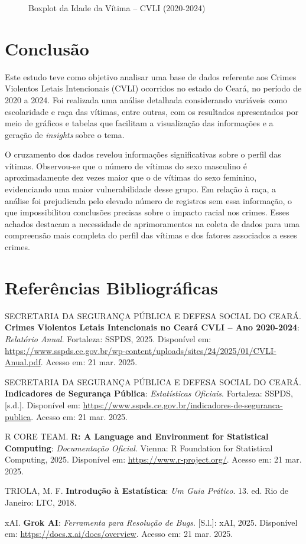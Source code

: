 \documentclass{exam}
\begin{document}
\begin{questions}
\begin{figure}[H]
    \centering
    
    \caption{Boxplot da Idade da Vítima -- CVLI (2020-2024)}
    \label{fig:boxplot_idade}
\end{figure}

\end{questions}

\section{Conclusão}
Este estudo teve como objetivo analisar uma base de dados referente aos Crimes Violentos Letais Intencionais (CVLI) ocorridos no estado do Ceará, no período de 2020 a 2024. Foi realizada uma análise detalhada considerando variáveis como escolaridade e raça das vítimas, entre outras, com os resultados apresentados por meio de gráficos e tabelas que facilitam a visualização das informações e a geração de \textit{insights} sobre o tema.

O cruzamento dos dados revelou informações significativas sobre o perfil das vítimas. Observou-se que o número de vítimas do sexo masculino é aproximadamente dez vezes maior que o de vítimas do sexo feminino, evidenciando uma maior vulnerabilidade desse grupo. Em relação à raça, a análise foi prejudicada pelo elevado número de registros sem essa informação, o que impossibilitou conclusões precisas sobre o impacto racial nos crimes. Esses achados destacam a necessidade de aprimoramentos na coleta de dados para uma compreensão mais completa do perfil das vítimas e dos fatores associados a esses crimes.

\section{Referências Bibliográficas}
SECRETARIA DA SEGURANÇA PÚBLICA E DEFESA SOCIAL DO CEARÁ. \textbf{Crimes Violentos Letais Intencionais no Ceará CVLI – Ano 2020-2024}: \textit{Relatório Anual}. Fortaleza: SSPDS, 2025. Disponível em: \url{https://www.sspds.ce.gov.br/wp-content/uploads/sites/24/2025/01/CVLI-Anual.pdf}. Acesso em: 21 mar. 2025.

SECRETARIA DA SEGURANÇA PÚBLICA E DEFESA SOCIAL DO CEARÁ. \textbf{Indicadores de Segurança Pública}: \textit{Estatísticas Oficiais}. Fortaleza: SSPDS, [s.d.]. Disponível em: \url{https://www.sspds.ce.gov.br/indicadores-de-seguranca-publica}. Acesso em: 21 mar. 2025.

R CORE TEAM. \textbf{R: A Language and Environment for Statistical Computing}: \textit{Documentação Oficial}. Vienna: R Foundation for Statistical Computing, 2025. Disponível em: \url{https://www.r-project.org/}. Acesso em: 21 mar. 2025.

TRIOLA, M. F. \textbf{Introdução à Estatística}: \textit{Um Guia Prático}. 13. ed. Rio de Janeiro: LTC, 2018.

xAI. \textbf{Grok AI}: \textit{Ferramenta para Resolução de Bugs}. [S.l.]: xAI, 2025. Disponível em: \url{https://docs.x.ai/docs/overview}. Acesso em: 21 mar. 2025.
\end{document}
